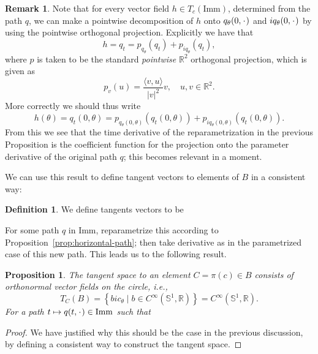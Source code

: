 \documentclass[a4,danish]{article}
\theoremstyle{break}
\newtheorem{proposition}[subsection]{Proposition}
\theoremstyle{definition}
\newtheorem{definition}[subsection]{Definition}
\theoremstyle{Break}
\newtheorem{remark}[subsection]{Remark}
\newcommand{\R}{\mathbb{R}}
\newcommand{\I}{\text{Imm}}
\renewcommand{\S}{\mathbb{S}}
\newcommand{\blank}{\makebox[1ex]{\textbf{$\cdot$}}}
\begin{document}
\begin{remark}
  Note that for every vector field $h \in T_c(\I)$, determined from the path $q$, we can make a pointwise decomposition of $h$ onto $q_{\theta}(0, \blank)$ and $iq_{\theta}(0, \blank)$ by using the pointwise orthogonal projection. Explicitly we have that
  \begin{equation*}
    h = q_t = p_{q_{\theta}}(q_{t}) + p_{iq_{\theta}}(q_{t}), 
  \end{equation*}
  where $p$ is taken to be the standard \textit{pointwise} $\R^2$ orthogonal projection, which is given as
  \begin{equation*}
    p_v(u) = \frac{\langle v, u \rangle}{|v|^2} v, \quad u, v \in \R^2.
  \end{equation*}
  More correctly we should thus write
  \begin{equation*}
    h(\theta) = q_t(0,\theta) = p_{q_{\theta}(0,\theta)}(q_{t}(0,\theta)) +
    p_{iq_{\theta}(0,\theta)}(q_{t}(0,\theta)).
  \end{equation*}
  From this we see that the time derivative of the reparametrization in the previous Proposition is the coefficient function for the projection onto the parameter derivative of the original path $q$; this becomes relevant in a moment. 
\end{remark}

We can use this result to define tangent vectors to elements of $B$ in
a consistent way:

\begin{definition}
  We define tangents vectors to be 
\end{definition}

For some path $q$ in $\I$, reparametrize this according to Proposition~\ref{prop:horizontal-path}; then take derivative as in the parametrized case of this new path. This leads us to the following result.

\begin{proposition}
  The tangent space to an element $C = \pi(c) \in B$ consists of orthonormal vector fields on the circle, i.e.,
  \begin{equation*}
    T_C(B) = 
    \left\{
      b i c_{\theta} \mid b \in C^{\infty}(\S^1,\R)
    \right\}
    = C^{\infty}(\S^1,\R).
  \end{equation*}
  For a path $t \mapsto q(t,\blank) \in \I$ such that 
\end{proposition}

\begin{proof}
  We have justified why this should be the case in the previous discussion, by defining a consistent way to construct the tangent space. 
\end{proof}
\end{document}
